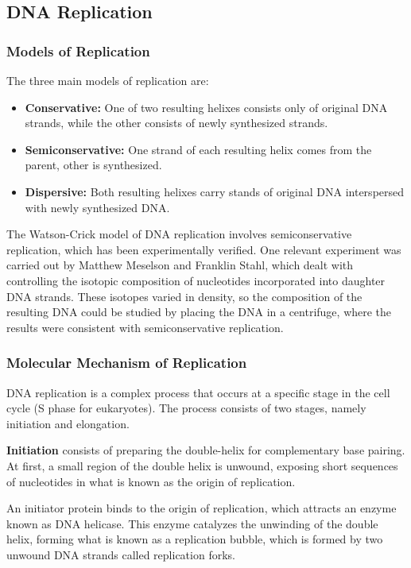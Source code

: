 \documentclass[12pt,titlepage]{article}
\begin{document}
      \subsection{DNA Replication}
        \subsubsection{Models of Replication}
          The three main models of replication are:
          \begin{itemize}
            \item \textbf{Conservative:} One of two resulting helixes consists only of original DNA strands, while the other consists of newly synthesized strands.
            \item \textbf{Semiconservative:} One strand of each resulting helix comes from the parent, other is synthesized.
            \item \textbf{Dispersive:} Both resulting helixes carry stands of original DNA interspersed with newly synthesized DNA.
          \end{itemize}

          The Watson-Crick model of DNA replication involves semiconservative replication, which has been experimentally verified. One relevant experiment was carried
          out by Matthew Meselson and Franklin Stahl, which dealt with controlling the isotopic composition of nucleotides incorporated into daughter DNA strands. These
          isotopes varied in density, so the composition of the resulting DNA could be studied by placing the DNA in a centrifuge, where the results were consistent with
          semiconservative replication.

        \subsubsection{Molecular Mechanism of Replication}
          DNA replication is a complex process that occurs at a specific stage in the cell cycle (S phase for eukaryotes). The process consists of two stages, namely
          initiation and elongation.

          \textbf{Initiation} consists of preparing the double-helix for complementary base pairing. At first, a small region of the double helix is unwound, exposing
          short sequences of nucleotides in what is known as the origin of replication.

          An initiator protein binds to the origin of replication, which attracts an enzyme known as DNA helicase. This enzyme catalyzes the unwinding of the double
          helix, forming what is known as a replication bubble, which is formed by two unwound DNA strands called replication forks.
\end{document}
